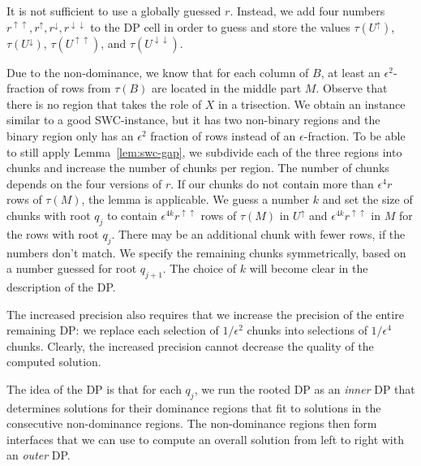 It is not sufficient to use a globally guessed $r$. 
Instead, we add four numbers ${r}^{\uparrow\uparrow},{r}^\uparrow,{r}^\downarrow,{r}^{\downarrow\downarrow}$ to the DP cell in order to guess and store the values 
$\tau({U}^\uparrow)$, $\tau({U^\downarrow})$, $\tau({U^{\uparrow\uparrow}})$, and $\tau({U^{\downarrow\downarrow}})$.

Due to the non-dominance, we know that for each column of ${B}$, at least an $\epsilon^2$-fraction of rows from $\tau(B)$ are located in the middle part ${M}$.
Observe that there is no region that takes the role of $X$ in a trisection.
We obtain an instance similar to a good SWC-instance, but it has two non-binary regions and the binary region only has an $\epsilon^2$ fraction of rows instead of an $\epsilon$-fraction.
To be able to still apply Lemma~\ref{lem:swc-gap}, we subdivide each of the three regions into chunks and increase the number of chunks per region. 
The number of chunks depends on  the four versions of ${r}$. 
If our chunks do not contain more than $\epsilon^4 {r}$ rows of $\tau(M)$, the lemma is applicable.
We guess a number $k$ and set the size of chunks with root $q_j$ to contain $\epsilon^{4k} {r}^{\uparrow\uparrow}$ rows of $\tau(M)$ in ${U}^\uparrow$ and $\epsilon^{4k} {r}^{\uparrow\uparrow}$ in ${M}$ for the rows with root $q_j$.
There may be an additional chunk with fewer rows, if the numbers don't match.
We specify the remaining chunks symmetrically, based on a number guessed for root $q_{j+1}$.
The choice of $k$ will become clear in the description of the DP.

The increased precision also requires that we  increase the precision of the entire remaining DP: we replace each selection of $1/\epsilon^2$ chunks into selections of $1/\epsilon^4$ chunks.
Clearly, the increased precision cannot decrease the quality of the computed solution.

The idea of the DP is that for each $q_j$, we run the rooted DP as an \emph{inner} DP that determines solutions for their dominance regions that fit to solutions in the consecutive non-dominance regions.
The non-dominance regions then form interfaces that we can use to compute an overall solution from left to right with an \emph{outer} DP.

